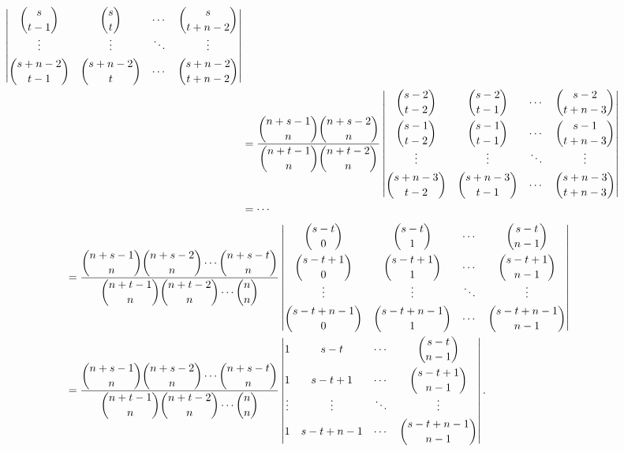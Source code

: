 \documentclass{ctexart}
\begin{document}
\begin{solution}
\begin{landscape}
\begin{align*}
\begin{vmatrix}
                \dbinom{s}{t-1} & \dbinom{s}{t} & \cdots & \dbinom{s}{t+n-2} \\
                \vdots & \vdots & \ddots & \vdots \\[4pt]
                \dbinom{s+n-2}{t-1} & \dbinom{s+n-2}{t} & \cdots & \dbinom{s+n-2}{t+n-2} \\
            \end{vmatrix} \\
            & =\dfrac{\dbinom{n+s-1}{n}\dbinom{n+s-2}{n}}{\dbinom{n+t-1}{n}\dbinom{n+t-2}{n}}\begin{vmatrix}
                \dbinom{s-2}{t-2} & \dbinom{s-2}{t-1} & \cdots & \dbinom{s-2}{t+n-3} \\[10pt]
                \dbinom{s-1}{t-2} & \dbinom{s-1}{t-1} & \cdots & \dbinom{s-1}{t+n-3} \\
                \vdots & \vdots & \ddots & \vdots \\[4pt]
                \dbinom{s+n-3}{t-2} & \dbinom{s+n-3}{t-1} & \cdots & \dbinom{s+n-3}{t+n-3} \\
            \end{vmatrix} \\
            & =\cdots
        \end{align*}
        \begin{align*}
            & =\dfrac{\dbinom{n+s-1}{n}\dbinom{n+s-2}{n}\cdots\dbinom{n+s-t}{n}}{\dbinom{n+t-1}{n}\dbinom{n+t-2}{n}\cdots\dbinom{n}{n}}\begin{vmatrix}
                \dbinom{s-t}{0} & \dbinom{s-t}{1} & \cdots & \dbinom{s-t}{n-1} \\[10pt]
                \dbinom{s-t+1}{0} & \dbinom{s-t+1}{1} & \cdots & \dbinom{s-t+1}{n-1} \\
                \vdots & \vdots & \ddots & \vdots \\[4pt]
                \dbinom{s-t+n-1}{0} & \dbinom{s-t+n-1}{1} & \cdots & \dbinom{s-t+n-1}{n-1} \\
            \end{vmatrix} \\
            & =\dfrac{\dbinom{n+s-1}{n}\dbinom{n+s-2}{n}\cdots\dbinom{n+s-t}{n}}{\dbinom{n+t-1}{n}\dbinom{n+t-2}{n}\cdots\dbinom{n}{n}}\begin{vmatrix}
                1 & s-t & \cdots & \dbinom{s-t}{n-1} \\[10pt]
                1 & s-t+1 & \cdots & \dbinom{s-t+1}{n-1} \\
                \vdots & \vdots & \ddots & \vdots \\[4pt]
                1 & s-t+n-1 & \cdots & \dbinom{s-t+n-1}{n-1} \\
            \end{vmatrix}.
        \end{align*}
    \end{landscape}
    

\end{solution}
\end{document}
